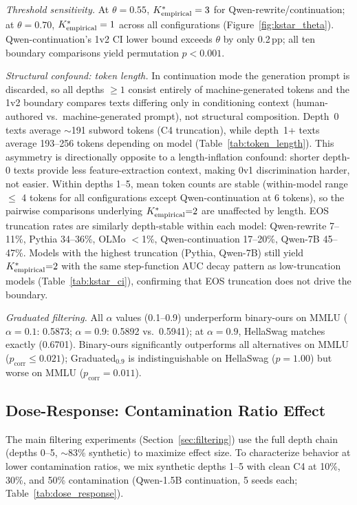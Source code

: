 \emph{Threshold sensitivity.}
At $\theta = 0.55$, ${K^*_{\text{empirical}}} = 3$ for Qwen-rewrite/continuation; at $\theta = 0.70$, ${K^*_{\text{empirical}}} = 1$ across all configurations (Figure~\ref{fig:kstar_theta}).
Qwen-continuation's 1v2 CI lower bound exceeds $\theta$ by only 0.2\,pp; all ten boundary comparisons yield permutation $p < 0.001$.

\emph{Structural confound: token length.}
In continuation mode the generation prompt is discarded, so all depths $\geq 1$ consist entirely of machine-generated tokens and the 1v2 boundary compares texts differing only in conditioning context (human-authored vs.\ machine-generated prompt), not structural composition.
Depth~0 texts average ${\sim}$191 subword tokens (C4 truncation), while depth~1+ texts average 193--256 tokens depending on model (Table~\ref{tab:token_length}).
This asymmetry is directionally opposite to a length-inflation confound: shorter depth-0 texts provide less feature-extraction context, making 0v1 discrimination harder, not easier.
Within depths 1--5, mean token counts are stable (within-model range $\leq$ 4 tokens for all configurations except Qwen-continuation at 6 tokens), so the pairwise comparisons underlying ${K^*_{\text{empirical}}}{=}2$ are unaffected by length.
EOS truncation rates are similarly depth-stable within each model: Qwen-rewrite 7--11\%, Pythia 34--36\%, OLMo $<$1\%, Qwen-continuation 17--20\%, Qwen-7B 45--47\%.
Models with the highest truncation (Pythia, Qwen-7B) still yield ${K^*_{\text{empirical}}}{=}2$ with the same step-function AUC decay pattern as low-truncation models (Table~\ref{tab:kstar_ci}), confirming that EOS truncation does not drive the boundary.

\emph{Graduated filtering.}
All $\alpha$ values (0.1--0.9) underperform binary-ours on MMLU ($\alpha{=}0.1$: 0.5873; $\alpha{=}0.9$: 0.5892 vs.\ 0.5941); at $\alpha{=}0.9$, HellaSwag matches exactly (0.6701).
Binary-ours significantly outperforms all alternatives on MMLU ($p_{\text{corr}} \leq 0.021$); Graduated$_{0.9}$ is indistinguishable on HellaSwag ($p = 1.00$) but worse on MMLU ($p_{\text{corr}} = 0.011$).
\label{tab:pairwise_significance}

\subsection{Dose-Response: Contamination Ratio Effect}
\label{sec:dose_response}

The main filtering experiments (Section~\ref{sec:filtering}) use the full depth chain (depths 0--5, ${\sim}$83\% synthetic) to maximize effect size.
To characterize behavior at lower contamination ratios, we mix synthetic depths 1--5 with clean C4 at 10\%, 30\%, and 50\% contamination (Qwen-1.5B continuation, 5 seeds each; Table~\ref{tab:dose_response}).


